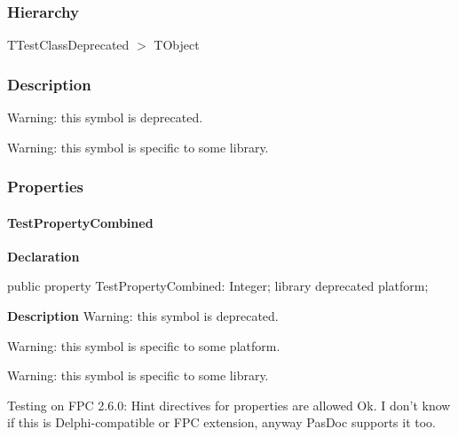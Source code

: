 \documentclass{report}
\begin{document}
\subsubsection*{\large{\textbf{Hierarchy}}\normalsize\hspace{1ex}\hfill}
TTestClassDeprecated {$>$} TObject
\subsubsection*{\large{\textbf{Description}}\normalsize\hspace{1ex}\hfill}
Warning: this symbol is deprecated.

Warning: this symbol is specific to some library.

\subsubsection*{\large{\textbf{Properties}}\normalsize\hspace{1ex}\hfill}
\paragraph*{TestPropertyCombined}\hspace*{\fill}

\begin{list}{}{
\setlength{\itemindent}{0cm}
\setlength{\listparindent}{0cm}
\setlength{\leftmargin}{\evensidemargin}
\addtolength{\leftmargin}{\tmplength}
\settowidth{\labelsep}{X}
\addtolength{\leftmargin}{\labelsep}
\setlength{\labelwidth}{\tmplength}
}
\begin{flushleft}
\item[\textbf{Declaration}\hfill]
\begin{ttfamily}
public property TestPropertyCombined: Integer; library deprecated platform;\end{ttfamily}


\end{flushleft}
\par
\item[\textbf{Description}]
Warning: this symbol is deprecated.

Warning: this symbol is specific to some platform.

Warning: this symbol is specific to some library.

Testing on FPC 2.6.0: Hint directives for properties are allowed Ok. I don't know if this is Delphi{-}compatible or FPC extension, anyway PasDoc supports it too.

\end{list}
\end{document}
